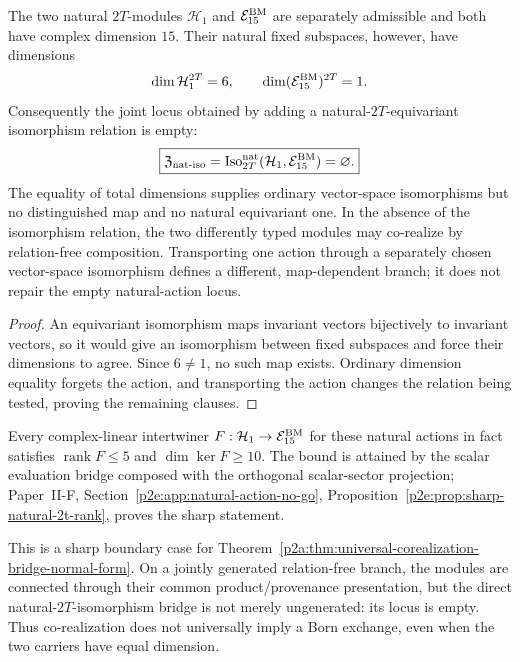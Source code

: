 \documentclass[12pt,a4paper]{article}
\begin{document}
\begin{corollary}
\label{p2e:cor:empty-natural-2t-identification-locus}
The two natural \(2T\)-modules \(\mathcal H_1\) and
\(\mathcal E_{15}^{\rm BM}\) are separately admissible and both have complex
dimension \(15\).  Their natural fixed subspaces, however, have dimensions
\[
 \dim\mathcal H_1^{2T}=6,
 \qquad
 \dim(\mathcal E_{15}^{\rm BM})^{2T}=1.
\]
Consequently the joint locus obtained by adding a natural-\(2T\)-equivariant
isomorphism relation is empty:
\[
 \boxed{
 \mathfrak Z_{\rm nat\text{-}iso}
 =
 \operatorname{Iso}_{2T}^{\rm nat}
   (\mathcal H_1,\mathcal E_{15}^{\rm BM})
 =\varnothing.}
\]
The equality of total dimensions supplies ordinary vector-space isomorphisms
but no distinguished map and no natural equivariant one.  In the absence of
the isomorphism relation, the two differently typed modules may co-realize by
relation-free composition.  Transporting one action through a separately
chosen vector-space isomorphism defines a different, map-dependent branch; it
does not repair the empty natural-action locus.
\end{corollary}

\begin{proof}
An equivariant isomorphism maps invariant vectors bijectively to invariant
vectors, so it would give an isomorphism between fixed subspaces and force
their dimensions to agree.  Since \(6\neq1\), no such map exists.  Ordinary
dimension equality forgets the action, and transporting the action changes
the relation being tested, proving the remaining clauses.
\end{proof}

Every complex-linear intertwiner
\(F:\mathcal H_1\to\mathcal E_{15}^{\rm BM}\) for these natural actions
in fact satisfies \(\operatorname{rank}F\le5\) and \(\dim\ker F\ge10\).
The bound is attained by the scalar evaluation bridge composed with the
orthogonal scalar-sector projection; Paper~II-F, Section~\ref{p2e:app:natural-action-no-go},
Proposition~\ref{p2e:prop:sharp-natural-2t-rank}, proves the sharp statement.

This is a sharp boundary case for
Theorem~\ref{p2a:thm:universal-corealization-bridge-normal-form}.  On a
jointly generated relation-free branch, the modules are connected through
their common product/provenance presentation, but the direct
natural-\(2T\)-isomorphism bridge is not merely ungenerated: its locus is
empty.  Thus co-realization does not universally imply a Born exchange, even
when the two carriers have equal dimension.
\end{document}
